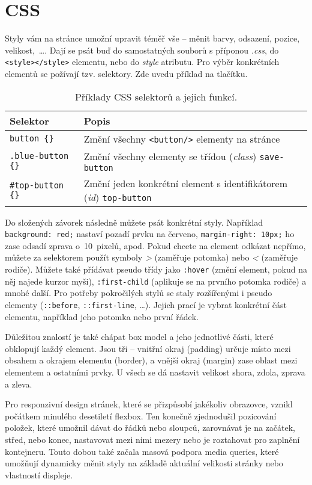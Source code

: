 \section{CSS}

Styly vám na stránce umožní upravit téměř vše – měnit barvy, odsazení, pozice,
\mbox{velikost},~\ldots. Dají se psát buď do samostatných souborů s příponou \textit{.css}, do \texttt{<style></style>} elementu, nebo do \textit{style} atributu. Pro výběr konkrétních elementů se požívají tzv. selektory. Zde uvedu příklad na tlačítku.

\begin{table}[h!]
\centering
\begin{tabular}{|>{\ttfamily}m{4cm}|m{8cm}|}
\hline
\textbf{Selektor} & \textbf{Popis} \\ \hline
\texttt{button \{\}} & Změní všechny \texttt{<button/>} elementy na stránce \\ \hline
\texttt{.blue-button \{\}} & Změní všechny elementy se třídou (\textit{class}) \texttt{save-button} \\ \hline
\texttt{\#top-button \{\}} & Změní jeden konkrétní element s identifikátorem (\textit{id}) \texttt{top-button} \\ \hline
\end{tabular}
\caption{Příklady CSS selektorů a jejich funkcí.}
\end{table}

Do složených závorek následně můžete psát konkrétní styly. Například \texttt{background: red;} nastaví pozadí prvku na červeno, \texttt{margin-right:~10px;} ho zase odsadí zprava o~10~pixelů, apod. Pokud chcete na element odkázat nepřímo, můžete za selektorem použít symboly \textit{>} (zaměřuje potomka) nebo \textit{<} (zaměřuje rodiče). Můžete také přídávat pseudo třídy jako \texttt{:hover} (změní element, pokud na něj najede kurzor myši), \texttt{:first-child} (aplikuje se na prvního potomka rodiče) a mnohé další. Pro potřeby pokročilých stylů se staly rozšířenými i pseudo elementy (\texttt{::before}, \texttt{::first-line}, \ldots). Jejich prací je vybrat konkrétní část elementu, například jeho potomka nebo první řádek.

Důležitou znalostí je také chápat box model a jeho jednotlivé části, které obklopují každý element. Jsou tři – vnitřní okraj (padding) určuje místo mezi obsahem a okrajem elementu (border), a vnější okraj (margin) zase oblast mezi elementem a ostatními prvky. U všech se dá nastavit velikost shora, zdola, zprava a zleva.

Pro responzivní design stránek, které se přizpůsobí jakékoliv obrazovce, vznikl počátkem minulého desetiletí flexbox. Ten konečně zjednodušil pozicování položek, které umožnil dávat do řádků nebo sloupců, zarovnávat je na začátek, střed, nebo konec, nastavovat mezi nimi mezery nebo je roztahovat pro zaplnění kontejneru.\cite{CSSFlexbox} Touto dobou také začala masová podpora media queries, které umožňují dynamicky měnit styly na základě aktuální velikosti stránky nebo vlastností displeje.